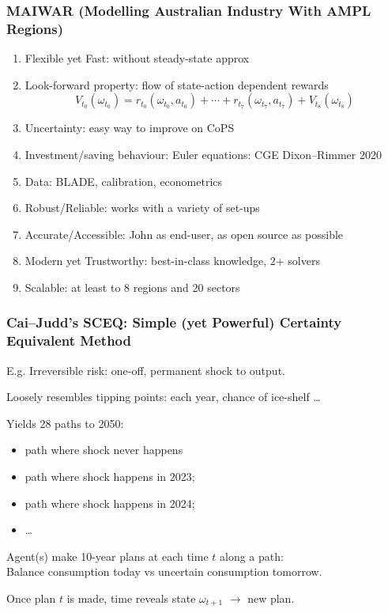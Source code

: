 \documentclass[handout,english]{beamer}
\begin{document}
\begin{frame}
  \frametitle{MAIWAR \small(Modelling Australian Industry With AMPL Regions)}
  \begin{enumerate}\footnotesize
    \item Flexible yet Fast: without steady-state approx
    \item Look-forward property: flow of state-action dependent rewards
  \[
    V_{t_0}(\omega_{t_0}) = r_{t_0}(\omega_{t_0}, a_{t_0}) + \cdots
    + r_{t_7}(\omega_{t_7}, a_{t_7}) + V_{t_8}(\omega_{t_8})
  \]
    \item Uncertainty: easy way to improve on CoPS
    \item Investment/saving behaviour: Euler equations: CGE Dixon--Rimmer 2020
    \item Data: BLADE, calibration, econometrics
    \item Robust/Reliable: works with a variety of set-ups
    \item Accurate/Accessible: John as end-user, as open source as possible
    \item Modern yet Trustworthy: best-in-class knowledge, 2+ solvers
    \item Scalable: at least to 8 regions and 20 sectors
  \end{enumerate}\normalsize
\end{frame}

\begin{frame}
  \frametitle{Cai--Judd's SCEQ: \small Simple (yet Powerful) Certainty Equivalent Method}
  E.g. Irreversible risk:  one-off, permanent shock to output.

  Loosely resembles tipping points: each year, chance of ice-shelf \dots

  Yields 28 paths to 2050:
    \begin{itemize}
    \item path where shock never happens
    \item path where shock happens in 2023;
    \item path where shock happens in 2024;
    \item \dots
    \end{itemize}
  Agent(s) make 10-year plans at each time $t$ along a path:\\
  
  Balance consumption today vs uncertain consumption tomorrow.

  Once plan $t$ is made, time reveals state $\omega_{t+1}$ $\rightarrow$ new plan.

\end{frame}
\end{document}
